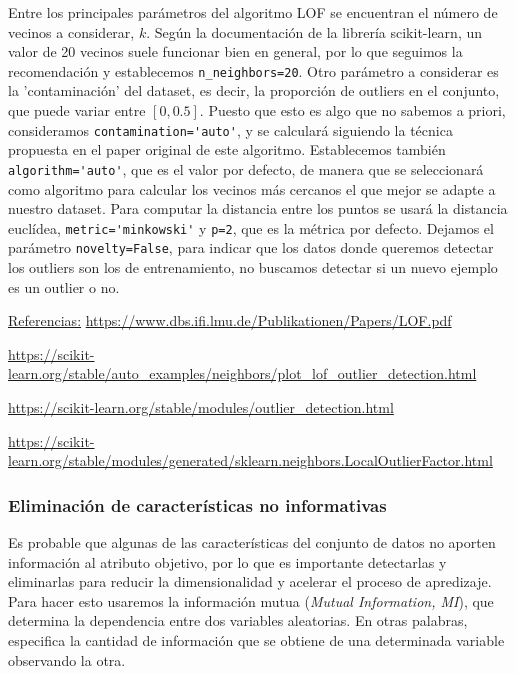 \documentclass[a4]{article}
\begin{document}
Entre los principales parámetros del algoritmo LOF se encuentran el número de vecinos a considerar, $ k $. Según la documentación de la librería scikit-learn, un valor de 20 vecinos suele funcionar bien en general, por lo que seguimos la recomendación y establecemos \lstinline|n_neighbors=20|. Otro parámetro a considerar es la 'contaminación' del dataset, es decir, la proporción de outliers en el conjunto, que puede variar entre $ [0,0.5] $. Puesto que esto es algo que no sabemos a priori, consideramos \lstinline|contamination='auto'|, y se calculará siguiendo la técnica propuesta en el paper original de este algoritmo. Establecemos también \lstinline|algorithm='auto'|, que es el valor por defecto, de manera que se seleccionará como algoritmo para calcular los vecinos más cercanos el que mejor se adapte a nuestro dataset. Para computar la distancia entre los puntos se usará la distancia euclídea, \lstinline|metric='minkowski'| y \lstinline|p=2|, que es la métrica por defecto. Dejamos el parámetro \lstinline|novelty=False|, para indicar que los datos donde queremos detectar los outliers son los de entrenamiento, no buscamos detectar si un nuevo ejemplo es un outlier o no. 

\underline{Referencias:}
\href{https://www.dbs.ifi.lmu.de/Publikationen/Papers/LOF.pdf}{https://www.dbs.ifi.lmu.de/Publikationen/Papers/LOF.pdf}

\href{https://scikit-learn.org/stable/auto_examples/neighbors/plot_lof_outlier_detection.html}{https://scikit-learn.org/stable/auto\_examples/neighbors/plot\_lof\_outlier\_detection.html}

\href{https://scikit-learn.org/stable/modules/outlier_detection.html#id1}{https://scikit-learn.org/stable/modules/outlier\_detection.html}

\href{https://scikit-learn.org/stable/modules/generated/sklearn.neighbors.LocalOutlierFactor.html}{https://scikit-learn.org/stable/modules/generated/sklearn.neighbors.LocalOutlierFactor.html}

\subsubsection{Eliminación de características no informativas}

Es probable que algunas de las características del conjunto de datos no aporten información al atributo objetivo, por lo que es importante detectarlas y eliminarlas para reducir la dimensionalidad y acelerar el proceso de apredizaje. Para hacer esto usaremos la información mutua (\textit{Mutual Information, MI}), que determina la dependencia entre dos variables aleatorias. En otras palabras, especifica la cantidad de información que se obtiene de una determinada variable observando la otra. 
\end{document}
